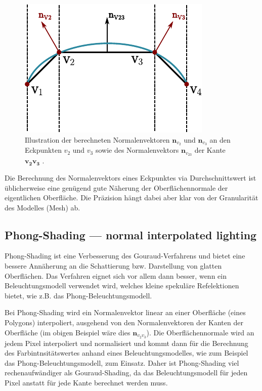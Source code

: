 \begin{figure}[H]
    \centering
    \includegraphics{img/shading_mesh_normals.pdf}
    \caption{Illustration der berechneten Normalenvektoren $\bm{n}_{v_{2}}$ und
    $\bm{n}_{v_{3}}$ an den Eckpunkten $v_{2}$ und $v_{3}$ sowie des
    Normalenvektors $\bm{n}_{v_{23}}$ der Kante $\bm{v_{2}v_{3}}$
    \protect\footnotemark.}\label{fig:gouraud_shading_normals_illustration}
\end{figure}

Die Berechnung des Normalenvektors eines Eckpunktes via Durchschnittswert ist
üblicherweise eine genügend gute Näherung der Oberflächennormale der
eigentlichen Oberfläche. Die Präzision hängt dabei aber klar von der
Granularität des Modelles (Mesh) ab.

\subsection{Phong-Shading --- normal interpolated lighting}
\label{subsec:phong_shading}

Phong-Shading ist eine Verbesserung des Gouraud-Verfahrens und bietet eine
bessere Annäherung an die Schattierung bzw. Darstellung von glatten
Oberflächen. Das Verfahren eignet sich vor allem dann besser, wenn ein
Beleuchtungsmodell verwendet wird, welches kleine spekuläre Refelektionen
bietet, wie z.B. das Phong-Beleuchtungsmodell.

Bei Phong-Shading wird ein Normalenvektor linear an einer Oberfläche (eines
Polygons) interpoliert, ausgehend von den Normalenvektoren der Kanten der
Oberfläche (im obigen Beispiel wäre dies $\bm{n}_{v_{2}v_{3}}$). Die
Oberflächennormale wird an jedem Pixel interpoliert und normalisiert und kommt
dann für die Berechnung des Farbintnsitätswertes anhand eines
Beleuchtungsmodelles, wie zum Beispiel das Phong-Beleuchtungsmodell, zum
Einsatz. Daher ist Phong-Shading viel rechenaufwändiger als Gouraud-Shading, da
das Beleuchtungsmodell für jeden Pixel anstatt für jede Kante berechnet werden
muss.

